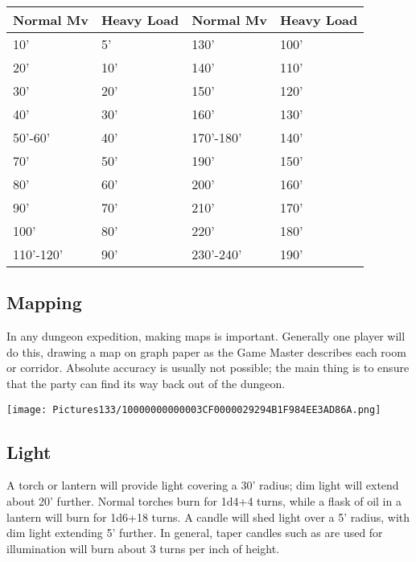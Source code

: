 \documentclass[a4paper,twoside,openany,10pt]{book}
\begin{document}
\begin{multicols}{2}
\begin{flushleft}
	\begin{tabularx}{0.47\textwidth}{@{}ll|ll@{}}
\textbf{Normal Mv}&\textbf{Heavy Load}&\textbf{Normal Mv}&\textbf{Heavy Load}\\\toprule
10' & 5' &  130' &100' \\\hline
20' & 10' &  140' &110' \\\hline
30' & 20' &  150' &120' \\\hline
40' & 30' &  160' &130' \\\hline
50'-60' & 40' &170'-180' & 140' \\\hline
70' & 50' &  190' &150' \\\hline
80' & 60' &  200' &160' \\\hline
90' & 70' &  210' &170' \\\hline
100' & 80' &  220' &180' \\\hline
110'-120' & 90'  &230'-240' & 190' \\\bottomrule
\end{tabularx}
\end{flushleft}

\subsection{Mapping}\label{mapping}

In any dungeon expedition, making maps is important. Generally one player will do this, drawing a map on graph paper as the Game Master describes each room or corridor. Absolute accuracy is usually not possible; the main thing is to ensure that the party can find its way back out of the dungeon.

\begin{flushleft}
	\texttt{[image: Pictures133/10000000000003CF0000029294B1F984EE3AD86A.png]}
\end{flushleft}

\subsection{Light}\label{light}

A torch or lantern will provide light covering a 30' radius; dim light will extend about 20' further. Normal torches burn for 1d4+4 turns, while a flask of oil in a lantern will burn for 1d6+18 turns. A candle will shed light over a 5' radius, with dim light extending 5' further. In general, taper candles such as are used for illumination will burn about 3 turns per inch of height.


\end{multicols}
\end{document}
